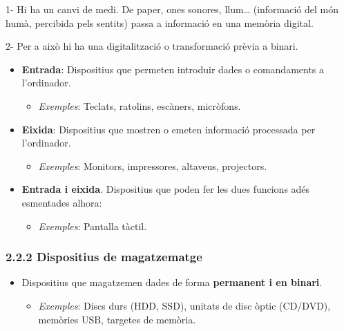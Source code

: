 \documentclass[
  12 pt,
  a4paper,
]{article}
\providecommand{\tightlist}{%
  \setlength{\itemsep}{0pt}\setlength{\parskip}{0pt}}
\begin{document}
1- Hi ha un canvi de medi. De paper, ones sonores, llum\ldots{}
(informació del món humà, percibida pels sentits) passa a informació en
una memòria digital.

2- Per a això hi ha una digitalització o transformació prèvia a binari.

\begin{itemize}
\tightlist
\item
  \textbf{Entrada}: Dispositius que permeten introduir dades o
  comandaments a l'ordinador.

  \begin{itemize}
  \tightlist
  \item
    \emph{Exemples}: Teclats, ratolins, escàners, micròfons.
  \end{itemize}
\item
  \textbf{Eixida}: Dispositius que mostren o emeten informació
  processada per l'ordinador.

  \begin{itemize}
  \tightlist
  \item
    \emph{Exemples}: Monitors, impressores, altaveus, projectors.
  \end{itemize}
\item
  \textbf{Entrada i eixida}. Dispositius que poden fer les dues funcions
  adés esmentades alhora:

  \begin{itemize}
  \tightlist
  \item
    \emph{Exemples}: Pantalla tàctil.
  \end{itemize}
\end{itemize}

\subsubsection{2.2.2 Dispositius de
magatzematge}\label{dispositius-de-magatzematge}

\begin{itemize}
\tightlist
\item
  Dispositius que magatzemen dades de forma \textbf{permanent i en
  binari}.

  \begin{itemize}
  \tightlist
  \item
    \emph{Exemples}: Discs durs (HDD, SSD), unitats de disc òptic
    (CD/DVD), memòries USB, targetes de memòria.
  \end{itemize}
\end{itemize}
\end{document}
